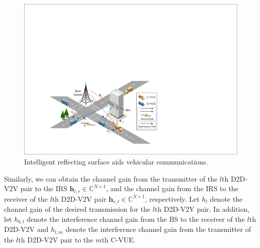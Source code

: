 \documentclass[journal]{IEEEtran}
\begin{document}
\begin{figure}[t]
	\centering
	\includegraphics[width=1.0\linewidth]{Fig1.pdf}%
	\caption{Intelligent reflecting surface aids vehicular communications.}  %
\end{figure}

Similarly, we can obtain the channel gain from the transmitter of the $l$th D2D-V2V pair to the IRS ${\bm{h}_{l,r}} \in \mathbb{C}^{{N \times 1}}$, and the channel gain from the IRS to the receiver of the $l$th D2D-V2V pair ${\bm{h}_{r,l}} \in \mathbb{C}^{{N \times 1}}$, respectively. Let ${h_l}$ denote the channel gain of the desired transmission for the $l$th D2D-V2V pair. In addition, let ${h_{b,l}}$ denote the interference channel gain from the BS to the receiver of the $l$th D2D-V2V and ${h_{l,m}}$ denote the interference channel gain from the transmitter of the $l$th D2D-V2V pair to the $m$th C-VUE.
\end{document}
